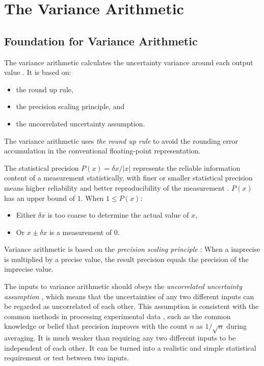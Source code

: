 \documentclass[twoside]{article}
\numberwithin{equation}{section}
\begin{document}
\clearpage
\section{The Variance Arithmetic}
\label{sec: variance arithmetic}


\subsection{Foundation for Variance Arithmetic}

The variance arithmetic calculates the uncertainty variance around each output value \cite{Prev_Precision_Arithmetic}.
It is based on:
\begin{itemize}
\item the round up rule,
\item the precision scaling principle, and
\item the uncorrelated uncertainty assumption.
\end{itemize}  

The variance arithmetic uses \emph{the round up rule} \cite{Prev_Precision_Arithmetic} to avoid the rounding error accumulation in the conventional floating-point representation.

The statistical precision $P(x) = \delta x/|x|$ represents the reliable information content of a measurement statistically, with finer or smaller statistical precision means higher reliability and better reproducibility of the measurement \cite{Statistical_Methods}\cite{Precisions_Physical_Measurements}. 
$P(x)$ has an upper bound of $1$.
When $1 \leq P(x)$:
\begin{itemize}
\item Either $\delta x$ is too coarse to determine the actual value of $x$, 

\item Or $x \pm \delta x$ is a measurement of $0$.
\end{itemize}
Variance arithmetic is based on the \emph{precision scaling principle} \cite{Prev_Precision_Arithmetic}: When a imprecise is multiplied by a precise value, the result precision equals the precision of the imprecise value.

The inputs to variance arithmetic should obeys the \emph{uncorrelated uncertainty assumption} \cite{Prev_Precision_Arithmetic}, which means that the uncertainties of any two different inputs can be regarded as uncorrelated of each other. 
This assumption is consistent with the common methods in processing experimental data \cite{Statistical_Methods}\cite{Precisions_Physical_Measurements}, such as the common knowledge or belief that precision improves with the count $n$ as $1 / \sqrt{n}$ during averaging.
It is much weaker than requiring any two different inputs to be independent of each other.
It can be turned into a realistic and simple statistical requirement or test between two inputs.
\end{document}

